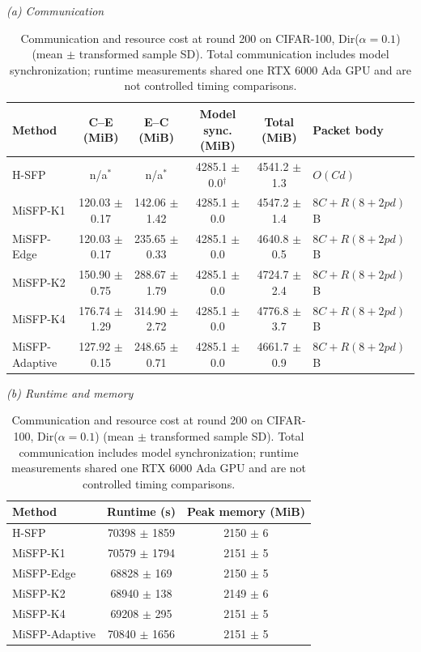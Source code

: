 \begin{table}[t]
\caption{Communication and resource cost at round 200 on CIFAR-100, Dir($\alpha{=}0.1$) (mean $\pm$ transformed sample SD). Total communication includes model synchronization; runtime measurements shared one RTX 6000 Ada GPU and are not controlled timing comparisons.}
\label{tab:resources}
\centering\footnotesize
\textit{(a) Communication}\\[-2pt]
\setlength{\tabcolsep}{3pt}
\begin{tabular*}{\textwidth}{@{\extracolsep{\fill}}lccccp{2.7cm}@{}}\toprule
Method & C--E (MiB) & E--C (MiB) & Model sync. (MiB) & Total (MiB) & Packet body\\\midrule
H-SFP & n/a$^\ast$ & n/a$^\ast$ & 4285.1 {\scriptsize $\pm$ 0.0}$^\dagger$ & 4541.2 {\scriptsize $\pm$ 1.3} & $O(Cd)$ \\
MiSFP-K1 & 120.03 {\scriptsize $\pm$ 0.17} & 142.06 {\scriptsize $\pm$ 1.42} & 4285.1 {\scriptsize $\pm$ 0.0} & 4547.2 {\scriptsize $\pm$ 1.4} & $8C+R(8+2pd)$ B \\
MiSFP-Edge & 120.03 {\scriptsize $\pm$ 0.17} & 235.65 {\scriptsize $\pm$ 0.33} & 4285.1 {\scriptsize $\pm$ 0.0} & 4640.8 {\scriptsize $\pm$ 0.5} & $8C+R(8+2pd)$ B \\
MiSFP-K2 & 150.90 {\scriptsize $\pm$ 0.75} & 288.67 {\scriptsize $\pm$ 1.79} & 4285.1 {\scriptsize $\pm$ 0.0} & 4724.7 {\scriptsize $\pm$ 2.4} & $8C+R(8+2pd)$ B \\
MiSFP-K4 & 176.74 {\scriptsize $\pm$ 1.29} & 314.90 {\scriptsize $\pm$ 2.72} & 4285.1 {\scriptsize $\pm$ 0.0} & 4776.8 {\scriptsize $\pm$ 3.7} & $8C+R(8+2pd)$ B \\
MiSFP-Adaptive & 127.92 {\scriptsize $\pm$ 0.15} & 248.65 {\scriptsize $\pm$ 0.71} & 4285.1 {\scriptsize $\pm$ 0.0} & 4661.7 {\scriptsize $\pm$ 0.9} & $8C+R(8+2pd)$ B \\
\bottomrule\end{tabular*}

\vspace{3pt}\textit{(b) Runtime and memory}\\[-2pt]
\begin{tabular*}{\textwidth}{@{\extracolsep{\fill}}lcc@{}}\toprule
Method & Runtime (s) & Peak memory (MiB)\\\midrule
H-SFP & 70398 {\scriptsize $\pm$ 1859} & 2150 {\scriptsize $\pm$ 6}\\
MiSFP-K1 & 70579 {\scriptsize $\pm$ 1794} & 2151 {\scriptsize $\pm$ 5}\\
MiSFP-Edge & 68828 {\scriptsize $\pm$ 169} & 2150 {\scriptsize $\pm$ 5}\\
MiSFP-K2 & 68940 {\scriptsize $\pm$ 138} & 2149 {\scriptsize $\pm$ 6}\\
MiSFP-K4 & 69208 {\scriptsize $\pm$ 295} & 2151 {\scriptsize $\pm$ 5}\\
MiSFP-Adaptive & 70840 {\scriptsize $\pm$ 1656} & 2151 {\scriptsize $\pm$ 5}\\
\bottomrule\end{tabular*}
\end{table}

